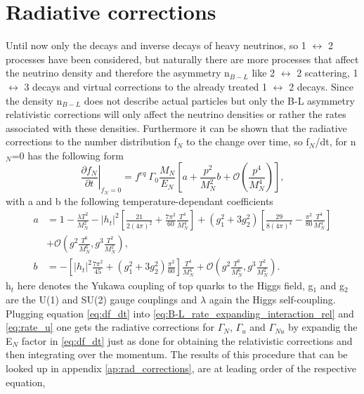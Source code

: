 \section{Radiative corrections}
Until now only the decays and inverse decays of heavy neutrinos, so 1 $\leftrightarrow$ 2 processes have been considered, but naturally there are more processes that affect the neutrino density and therefore the asymmetry n$_{B-L}$ like 2 $\leftrightarrow$ 2 scattering, 1 $\leftrightarrow$ 3 decays and virtual corrections to the already treated 1 $\leftrightarrow$ 2 decays. \newline\indent
Since the density n$_{B-L}$ does not describe actual particles but only the B-L asymmetry relativistic corrections will only affect the neutrino densities or rather the rates associated with these densities. Furthermore it can be shown that the radiative corrections to the number distribution f$_N$ to the change over time, so f$_N$/dt, for n$_N$=0 has the following form \cite{Laine:2011pq}
\begin{equation}
\left.\frac{\partial f_N}{\partial t}\right|_{f_N=0}=f^{eq}\:\Gamma_0\frac{M_N}{E_N}\left[a+\frac{p^2}{M_N^2}b+\mathcal{O}\left(\frac{p^4}{M_N^4}\right)\right],
\label{eq:df_dt}
\end{equation}
with a and b the following temperature-dependant coefficients
\begin{align}
a&=1-\frac{\lambda T^2}{M_N^2}-\left|h_t\right|^2\left[\frac{21}{2(4\pi)^2}+\frac{7\pi^2}{60}\frac{T^4}{M_N^4}\right]+\left(g_1^2+3g_2^2\right)\left[\frac{29}{8\left(4\pi\right)^4}-\frac{\pi^2}{80}\frac{T^4}{M_N^4}\right]\\
\nonumber
&+\mathcal{O}\left(g^2\frac{T^6}{M_N^6},g^3\frac{T^2}{M_N^2}\right),\\
b&=-\left[\left|h_t\right|^2\frac{7\pi^2}{45}+\left(g_1^2+3g_2^2\right)\frac{\pi^2}{60}\right]\frac{T^4}{M_N^4}+\mathcal{O}\left(g^2\frac{T^6}{M_N^6},g^3\frac{T^2}{M_N^2}\right).
\end{align}
h$_t$ here denotes the Yukawa coupling of top quarks to the Higgs field, g$_1$ and g$_2$ are the U(1) and SU(2) gauge couplings and $\lambda$ again the Higgs self-coupling. \newline\indent
Plugging equation \eqref{eq:df_dt} into \eqref{eq:B-L_rate_expanding_interaction_rel} and \eqref{eq:rate_u} one gets the radiative corrections for $\Gamma_N$, $\Gamma_u$ and $\Gamma_{Nu}$ by expandig the E$_N$ factor in \eqref{eq:df_dt} just as done for obtaining the relativistic corrections and then integrating over the momentum. The results of this procedure that can be looked up in appendix \ref{ap:rad_corrections}, are at leading order of the respective equation,
